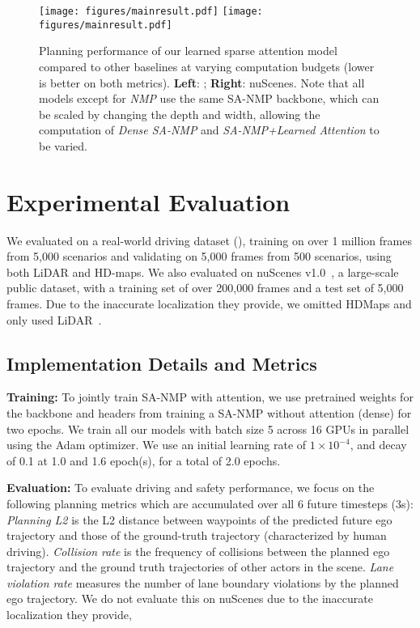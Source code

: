 \begin{figure*}[t]
\centering
\iflatexml
\texttt{[image: figures/mainresult.pdf]}
\else
\texttt{[image: figures/mainresult.pdf]}
\caption{\small Planning performance of our learned sparse attention model compared to other baselines at varying computation budgets (lower is better on both metrics). \textbf{Left}: \ourdata{}; \textbf{Right}: nuScenes. Note that all models except for \textit{NMP} use the same SA-NMP backbone, which can be scaled by changing the depth and width, allowing the computation of \textit{Dense SA-NMP} and \textit{SA-NMP+Learned Attention} to be varied.
}
\label{fig:mainresult}
\end{figure*}

\section{Experimental Evaluation}
We evaluated on a 
real-world driving dataset (\ourdata{}), training on over 1 million frames from 5,000 scenarios and validating on 5,000 frames from 500 scenarios, using both LiDAR and HD-maps.
We also evaluated on  nuScenes v1.0~\cite{nuscenes}, a large-scale public dataset, with a
training set of over 200,000 frames and a test set of 5,000 frames. Due to the inaccurate localization they provide, we omitted HDMaps and only used LiDAR~\cite{pnpnet}.

\subsection{Implementation Details and Metrics}
\label{sec:impl}

\textbf{Training:}
To jointly train SA-NMP with attention, we use pretrained
weights for the backbone and headers from training a SA-NMP
without attention (dense) for two epochs. 
We train all our models with batch size 5 across 16 GPUs in parallel using the Adam \cite{adam} optimizer. We use an initial learning rate of $1 \times 10^{-4}$, and decay of 0.1 at 1.0 and 1.6 epoch(s), for a total of 2.0 epochs.

\textbf{Evaluation:}
To evaluate driving and safety performance, we focus on the following planning metrics which are accumulated over all 6 future timesteps (3s): \textit{Planning L2} is the L2 distance between waypoints of the predicted future ego trajectory and those of the ground-truth trajectory (characterized by human driving). \textit{Collision rate} is the frequency of collisions between the planned ego trajectory and the ground truth trajectories of other actors in the scene. \textit{Lane violation rate} measures the number of lane boundary violations by the planned ego trajectory. 
We do not evaluate this on nuScenes due to the inaccurate localization they provide,

